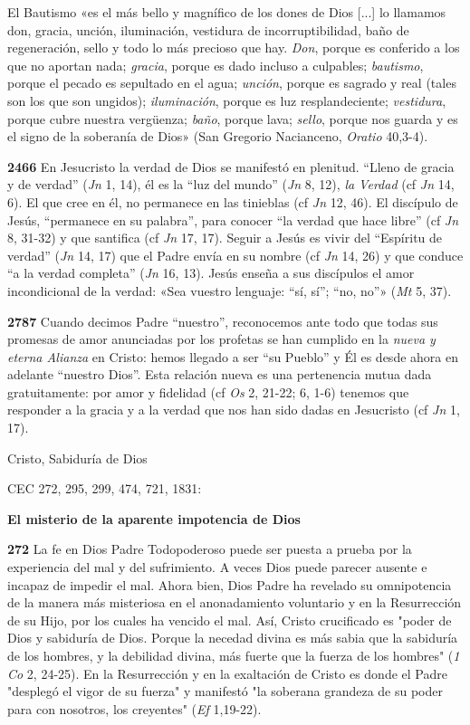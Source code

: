 \documentclass[]{article}
\begin{document}
El Bautismo «es el más bello y magnífico de los dones de Dios {[}...{]}
lo llamamos don, gracia, unción, iluminación, vestidura de
incorruptibilidad, baño de regeneración, sello y todo lo más precioso
que hay. \emph{Don}, porque es conferido a los que no aportan nada;
\emph{gracia}, porque es dado incluso a culpables; \emph{bautismo},
porque el pecado es sepultado en el agua; \emph{unción}, porque es
sagrado y real (tales son los que son ungidos); \emph{iluminación},
porque es luz resplandeciente; \emph{vestidura}, porque cubre nuestra
vergüenza; \emph{baño}, porque lava; \emph{sello}, porque nos guarda y
es el signo de la soberanía de Dios» (San Gregorio Nacianceno,
\emph{Oratio} 40,3-4).

\textbf{2466} En Jesucristo la verdad de Dios se manifestó en plenitud.
``Lleno de gracia y de verdad'' (\emph{Jn} 1, 14), él es la ``luz del
mundo'' (\emph{Jn} 8, 12), \emph{la Verdad} (cf \emph{Jn} 14, 6). El que
cree en él, no permanece en las tinieblas (cf \emph{Jn} 12, 46). El
discípulo de Jesús, ``permanece en su palabra'', para conocer ``la
verdad que hace libre'' (cf \emph{Jn} 8, 31-32) y que santifica (cf
\emph{Jn} 17, 17). Seguir a Jesús es vivir del ``Espíritu de verdad''
(\emph{Jn} 14, 17) que el Padre envía en su nombre (cf \emph{Jn} 14, 26)
y que conduce ``a la verdad completa'' (\emph{Jn} 16, 13). Jesús enseña
a sus discípulos el amor incondicional de la verdad: «Sea vuestro
lenguaje: ``sí, sí''; ``no, no''» (\emph{Mt} 5, 37).

\textbf{2787} Cuando decimos Padre ``nuestro'', reconocemos ante todo
que todas sus promesas de amor anunciadas por los profetas se han
cumplido en la \emph{nueva y eterna Alianza} en Cristo: hemos llegado a
ser ``su Pueblo'' y Él es desde ahora en adelante ``nuestro Dios''. Esta
relación nueva es una pertenencia mutua dada gratuitamente: por amor y
fidelidad (cf \emph{Os} 2, 21-22; 6, 1-6) tenemos que responder a la
gracia y a la verdad que nos han sido dadas en Jesucristo (cf \emph{Jn}
1, 17).

Cristo, Sabiduría de Dios

CEC 272, 295, 299, 474, 721, 1831:

\textbf{El misterio de la aparente impotencia de Dios}

\textbf{272} La fe en Dios Padre Todopoderoso puede ser puesta a prueba
por la experiencia del mal y del sufrimiento. A veces Dios puede parecer
ausente e incapaz de impedir el mal. Ahora bien, Dios Padre ha revelado
su omnipotencia de la manera más misteriosa en el anonadamiento
voluntario y en la Resurrección de su Hijo, por los cuales ha vencido el
mal. Así, Cristo crucificado es "poder de Dios y sabiduría de Dios.
Porque la necedad divina es más sabia que la sabiduría de los hombres, y
la debilidad divina, más fuerte que la fuerza de los hombres" (\emph{1
Co} 2, 24-25). En la Resurrección y en la exaltación de Cristo es donde
el Padre "desplegó el vigor de su fuerza" y manifestó "la soberana
grandeza de su poder para con nosotros, los creyentes" (\emph{Ef}
1,19-22).
\end{document}
